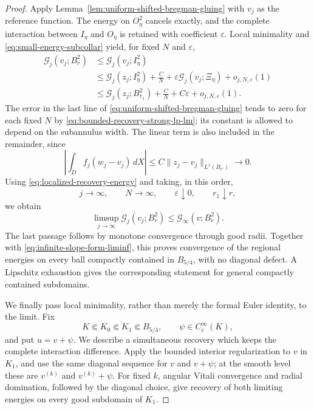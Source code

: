 \documentclass[11pt,reqno]{amsart}
\numberwithin{equation}{section}
\newcommand{\dd}{\,d}
\theoremstyle{remark}
\begin{document}
\begin{proof}
Apply Lemma~\ref{lem:uniform-shifted-bregman-gluing} with \(v_j\) as
the reference function.  The energy on \(O_\eta^2\) cancels exactly,
and the complete interaction between \(I_\eta\) and \(O_\eta\) is
retained with coefficient \(\varepsilon\).  Local minimality and
\eqref{eq:small-energy-subcollar} yield, for fixed \(N\) and
\(\varepsilon\),
\begin{align*}
 \mathscr G_j(v_j;B_r^2)
 &\le \mathscr G_j(v_j;I_\eta^2)\\
 &\le \mathscr G_j(z_j;I_\eta^2)
 +\frac CN+\varepsilon\mathscr G_j(v_j;\Xi_\eta)
 +o_{j,N,\varepsilon}(1)\\
 &\le \mathscr G_j(z_j;B_{r_1}^2)
 +\frac CN+C\varepsilon+o_{j,N,\varepsilon}(1).
\end{align*}
The error in the last line of
\eqref{eq:uniform-shifted-bregman-gluing} tends to zero for each fixed
\(N\) by \eqref{eq:bounded-recovery-strong-lp-lm}; its constant is
allowed to depend on the subannulus width.  The linear term is also
included in the remainder, since
\[
 \left|\int_Df_j(w_j-v_j)\dd X\right|
 \le C\|z_j-v_j\|_{L^1(B_{r'})}\longrightarrow0.
\]
Using \eqref{eq:localized-recovery-energy} and taking, in this order,
\[
 j\to\infty,\qquad N\to\infty,\qquad
 \varepsilon\downarrow0,\qquad r_1\downarrow r,
\]
we obtain
\begin{equation}
 \limsup_{j\to\infty}\mathscr G_j(v_j;B_r^2)
 \le\mathscr G_\infty(v;B_r^2).
 \label{eq:localized-relative-gluing-limsup}
\end{equation}
The last passage follows by monotone convergence through good radii.
Together with \eqref{eq:infinite-slope-form-liminf}, this proves
convergence of the regional energies on every ball compactly contained
in \(B_{5/4}\), with no diagonal defect.  A Lipschitz exhaustion gives
the corresponding statement for general compactly contained
subdomains.

We finally pass local minimality, rather than merely the formal Euler
identity, to the limit.  Fix
\[
 K\Subset K_0\Subset K_1\Subset B_{5/4},\qquad
 \psi\in C_c^\infty(K),
\]
and put \(u=v+\psi\).  We describe a simultaneous recovery which keeps
the complete interaction difference.  Apply the bounded interior
regularization to \(v\) in \(K_1\), and use the same diagonal sequence
for \(v\) and \(v+\psi\); at the smooth level these are
\(v^{(k)}\) and \(v^{(k)}+\psi\).  For fixed \(k\), angular Vitali
convergence and radial domination, followed by the diagonal choice,
give recovery of both
limiting energies on every good subdomain of \(K_1\).


\end{proof}
\end{document}
